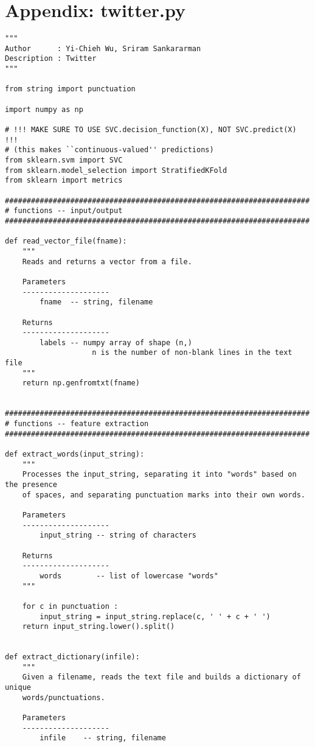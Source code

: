 \documentclass[11pt]{article}
\begin{document}
\section{Appendix: twitter.py}
\begin{verbatim}
"""
Author      : Yi-Chieh Wu, Sriram Sankararman
Description : Twitter
"""

from string import punctuation

import numpy as np

# !!! MAKE SURE TO USE SVC.decision_function(X), NOT SVC.predict(X) !!!
# (this makes ``continuous-valued'' predictions)
from sklearn.svm import SVC
from sklearn.model_selection import StratifiedKFold
from sklearn import metrics

######################################################################
# functions -- input/output
######################################################################

def read_vector_file(fname):
    """
    Reads and returns a vector from a file.
    
    Parameters
    --------------------
        fname  -- string, filename
        
    Returns
    --------------------
        labels -- numpy array of shape (n,)
                    n is the number of non-blank lines in the text file
    """
    return np.genfromtxt(fname)


######################################################################
# functions -- feature extraction
######################################################################

def extract_words(input_string):
    """
    Processes the input_string, separating it into "words" based on the presence
    of spaces, and separating punctuation marks into their own words.
    
    Parameters
    --------------------
        input_string -- string of characters
    
    Returns
    --------------------
        words        -- list of lowercase "words"
    """
    
    for c in punctuation :
        input_string = input_string.replace(c, ' ' + c + ' ')
    return input_string.lower().split()


def extract_dictionary(infile):
    """
    Given a filename, reads the text file and builds a dictionary of unique
    words/punctuations.
    
    Parameters
    --------------------
        infile    -- string, filename
    

\end{verbatim}
\end{document}

